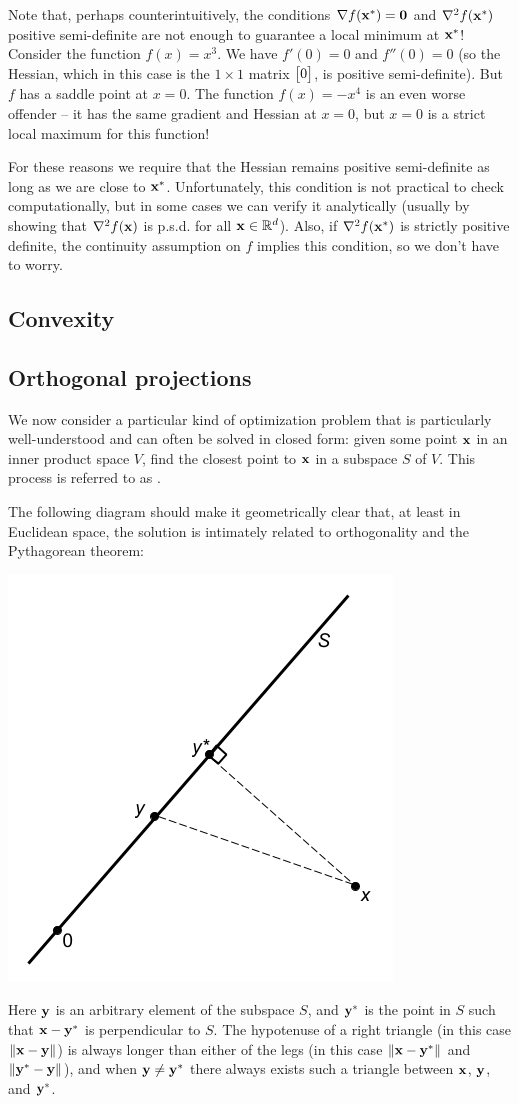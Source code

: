 Note that, perhaps counterintuitively, the conditions $\nabla f(\mathbf{x}^*) = \mathbf{0}$ and $\nabla^2 f(\mathbf{x}^*)$ positive semi-definite are not enough to guarantee a local minimum at $\mathbf{x}^*$!
Consider the function $f(x) = x^3$.
We have $f'(0) = 0$ and $f''(0) = 0$ (so the Hessian, which in this case is the $1 \times 1$ matrix $\begin{bmatrix}0\end{bmatrix}$, is positive semi-definite).
But $f$ has a saddle point at $x = 0$.
The function $f(x) = -x^4$ is an even worse offender -- it has the same gradient and Hessian at $x = 0$, but $x = 0$ is a strict local maximum for this function!

For these reasons we require that the Hessian remains positive semi-definite as long as we are close to $\mathbf{x}^*$.
Unfortunately, this condition is not practical to check computationally, but in some cases we can verify it analytically (usually by showing that $\nabla^2 f(\mathbf{x})$ is p.s.d. for all $\mathbf{x} \in \mathbb{R}^d$).
Also, if $\nabla^2 f(\mathbf{x}^*)$ is strictly positive definite, the continuity assumption on $f$ implies this condition, so we don't have to worry.

\subsection{Convexity}


\subsection{Orthogonal projections}
We now consider a particular kind of optimization problem that is particularly well-understood and can often be solved in closed form: given some point $\mathbf{x}$ in an inner product space $V$, find the closest point to $\mathbf{x}$ in a subspace $S$ of $V$.
This process is referred to as .

The following diagram should make it geometrically clear that, at least in Euclidean space, the solution is intimately related to orthogonality and the Pythagorean theorem:
\begin{center}
\includegraphics[width=0.5\linewidth]{orthogonal-projection}
\end{center}
Here $\mathbf{y}$ is an arbitrary element of the subspace $S$, and $\mathbf{y}^*$ is the point in $S$ such that $\mathbf{x}-\mathbf{y}^*$ is perpendicular to $S$.
The hypotenuse of a right triangle (in this case $\|\mathbf{x}-\mathbf{y}\|$) is always longer than either of the legs (in this case $\|\mathbf{x}-\mathbf{y}^*\|$ and $\|\mathbf{y}^*-\mathbf{y}\|$), and when $\mathbf{y} \neq \mathbf{y}^*$ there always exists such a triangle between $\mathbf{x}$, $\mathbf{y}$, and $\mathbf{y}^*$.

